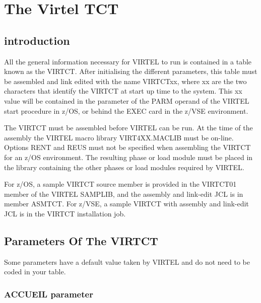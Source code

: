 \documentclass[letterpaper,10pt,english]{sphinxmanual}
\begin{document}
\label{\detokenize{Installation_Guide:vvrrig-virtct}}
\ignorespaces 

\chapter{The Virtel TCT}
\label{\detokenize{Installation_Guide:the-virtel-tct}}\label{\detokenize{Installation_Guide:index-29}}

\section{introduction}
\label{\detokenize{Installation_Guide:id5}}
All the general information necessary for VIRTEL to run is contained in a table known as the VIRTCT. After initialising the different  parameters, this table must be assembled and link edited with the name VIRTCTxx, where xx are the two characters that identify the VIRTCT at start up time to the system. This xx value will be contained in the parameter of the PARM operand of the VIRTEL start procedure in z/OS, or behind the EXEC card in the z/VSE environment.

The VIRTCT must be assembled before VIRTEL can be run. At the time of the assembly the VIRTEL macro library VIRT4XX.MACLIB must be on-line. Options RENT and REUS must not be specified when assembling the VIRTCT for an z/OS environment. The resulting phase or load module must be placed in the library containing the other phases or load modules required by VIRTEL.

For z/OS, a sample VIRTCT source member is provided in the VIRTCT01 member of the VIRTEL SAMPLIB, and the assembly and link-edit JCL is in member ASMTCT. For z/VSE, a sample VIRTCT with assembly and link-edit JCL is in the VIRTCT installation job.


\section{Parameters Of The VIRTCT}
\label{\detokenize{Installation_Guide:parameters-of-the-virtct}}
Some parameters have a default value taken by VIRTEL and do not need to be coded in your table.

\ignorespaces 

\subsection{ACCUEIL parameter}
\label{\detokenize{Installation_Guide:accueil-parameter}}\label{\detokenize{Installation_Guide:index-30}}
\begin{sphinxVerbatim}[commandchars=\\\{\}]
\PYG{p}{[}\PYG{p}{]} 
\end{sphinxVerbatim}
\end{document}
